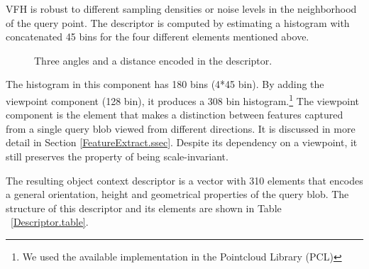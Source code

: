 VFH is robust to different sampling densities or noise levels in the neighborhood of the query point. 
The descriptor is computed by estimating a histogram with concatenated 45 bins for the four different elements mentioned above.

\begin{figure}[t]
  \caption[Local geometry elements of VFH.]
  {Three angles and a distance encoded in the descriptor.\cite{VFH_Definition}}
  \label{FPFH.figure}
\end{figure}

The histogram in this component has 180 bins (4*45 bin).
By adding the viewpoint component (128 bin), it produces a 308 bin histogram.\footnote{We used the available implementation in the Pointcloud Library (PCL)}
The viewpoint component is the element that makes a distinction between features captured from a single query blob viewed from different directions.
It is discussed in more detail in Section \ref{FeatureExtract.ssec}.
Despite its dependency on a viewpoint, it still preserves the property of being scale-invariant. 




The resulting object context descriptor is a vector with 310 elements that encodes a general orientation, height and
geometrical properties of the query blob.
The structure of this descriptor and its elements are shown in Table ~\ref{Descriptor.table}.

